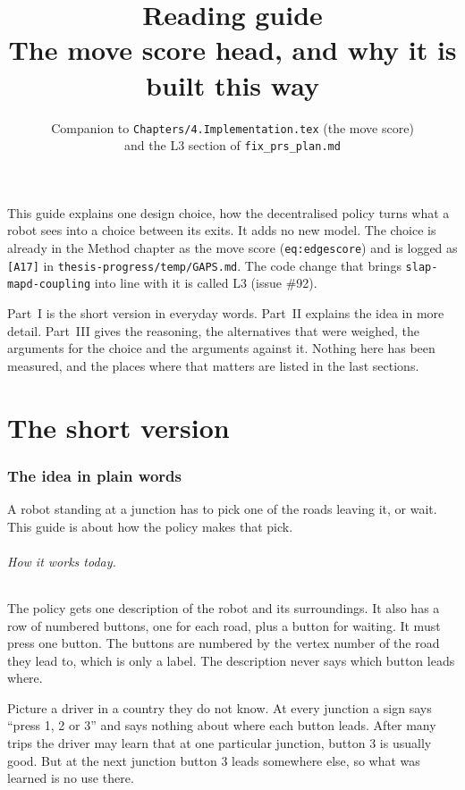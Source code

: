 \documentclass[11pt,a4paper]{article}
\title{Reading guide\\[2pt]\large The move score head, and why it is built this way}
\author{Companion to \texttt{Chapters/4.Implementation.tex} (the move score)\\and the L3 section of \texttt{fix\_prs\_plan.md}}
\date{}
\begin{document}
\maketitle

\noindent This guide explains one design choice, how the decentralised
policy turns what a robot sees into a choice between its exits. It adds no
new model. The choice is already in the Method chapter as the move score
(\texttt{eq:edgescore}) and is logged as \texttt{[A17]} in
\texttt{thesis-progress/temp/GAPS.md}. The code change that brings
\texttt{slap-mapd-coupling} into line with it is called L3 (issue \#92).

Part~I is the short version in everyday words. Part~II explains the idea in
more detail. Part~III gives the reasoning, the alternatives that were
weighed, the arguments for the choice and the arguments against it. Nothing here has been measured, and
the places where that matters are listed in the last sections.

\tableofcontents

\part{The short version}

\section{The idea in plain words}

A robot standing at a junction has to pick one of the roads leaving it, or
wait. This guide is about how the policy makes that pick.

\paragraph{How it works today.} The policy gets one description of the robot
and its surroundings. It also has a row of numbered buttons, one for each
road, plus a button for waiting. It must press one button. The buttons are
numbered by the vertex number of the road they lead to, which is only a
label. The description never says which button leads where.

Picture a driver in a country they do not know. At every junction a sign says
``press 1, 2 or 3'' and says nothing about where each button leads. After
many trips the driver may learn that at one particular junction, button 3 is
usually good. But at the next junction button 3 leads somewhere else, so what
was learned is no use there.
\end{document}
